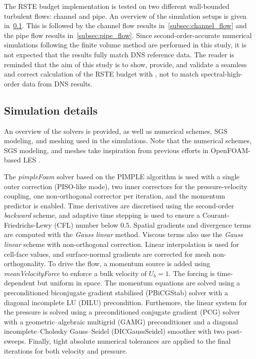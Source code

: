The RSTE budget implementation is tested on two different wall-bounded turbulent flows: channel and pipe.
An overview of the simulation setups is given in~\ref{subsec:simulation_details}.
This is followed by the channel flow results in~\ref{subsec:channel_flow} and the pipe flow results in~\ref{subsec:pipe_flow}. Since second-order-accurate numerical simulations following the finite volume method are performed in this study, it is not expected that the results fully match DNS reference data. The reader is reminded that the aim of this study is to show, provide, and validate a seamless and correct calculation of the RSTE budget with \OF, not to match spectral-high-order data from DNS results.

\subsection{Simulation details}
\label{subsec:simulation_details}

An overview of the solvers is provided, as well as numerical schemes, SGS modeling, and meshing used in the simulations.
Note that the numerical schemes, SGS modeling, and meshes take inspiration from previous efforts in OpenFOAM-based LES \cite{matai2019large, mukha2019library,nozarian2025laminarization,hansen2026wall}.

The \emph{pimpleFoam} solver based on the PIMPLE algorithm is used with a single outer correction (PISO-like mode), two inner correctors for the pressure-velocity coupling, one non-orthogonal corrector per iteration, and the momentum predictor is enabled.
Time derivatives are discretised using the second-order \emph{backward} scheme, and adaptive time stepping is used to ensure a Courant-Friedrichs-Lewy (CFL) number below $0.5$. 
Spatial gradients and divergence terms are computed with the \emph{Gauss linear} method. 
Viscous terms also use the \emph{Gauss linear} scheme with non-orthogonal correction.
Linear interpolation is used for cell-face values, and surface-normal gradients are corrected for mesh non-orthogonality.
To drive the flow, a momentum source is added using \emph{meanVelocityForce} to enforce a bulk velocity of $U_b = 1$.
The forcing is time-dependent but uniform in space.
The momentum equations are solved using a preconditioned biconjugate gradient stabilised (PBiCGStab) solver with a diagonal incomplete LU (DILU) precondition. Furthemore, the linear system for the pressure is solved using a preconditioned conjugate gradient (PCG) solver with a geometric–algebraic multigrid (GAMG) preconditioner and a diagonal incomplete–Cholesky Gauss–Seidel (DICGaussSeidel) smoother with two post-sweeps. Finally, tight absolute numerical tolerances are applied to the final iterations for both velocity and pressure.


